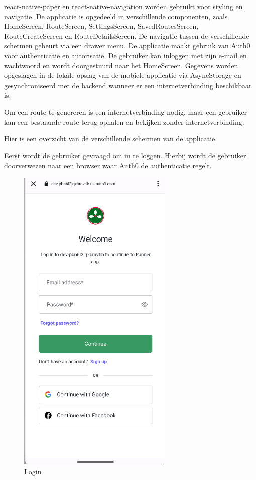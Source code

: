    react-native-paper en react-native-navigation worden gebruikt voor styling en navigatie. 
    De applicatie is opgedeeld in verschillende componenten, 
    zoals HomeScreen, RouteScreen, SettingsScreen, SavedRoutesScreen, RouteCreateScreen en RouteDetailsScreen. 
    De navigatie tussen de verschillende schermen gebeurt via een drawer menu. 
    De applicatie maakt gebruik van Auth0 voor authenticatie en autorisatie. 
    De gebruiker kan inloggen met zijn e-mail en wachtwoord en wordt doorgestuurd naar het HomeScreen. 
    Gegevens worden opgeslagen in de lokale opslag van de mobiele applicatie via AsyncStorage 
    en gesynchroniseerd met de backend wanneer er een internetverbinding beschikbaar is.

    Om een route te genereren is een internetverbinding nodig, 
    maar een gebruiker kan een bestaande route terug ophalen en bekijken zonder internetverbinding.
    
    Hier is een overzicht van de verschillende schermen van de applicatie.
    
    Eerst wordt de gebruiker gevraagd om in te loggen. Hierbij wordt de gebruiker doorverwezen naar een browser waar Auth0 de authenticatie regelt.

    \begin{figure}[htbp]
        \includegraphics[width=20em]{./graphics/login.png}
        \centering
        \caption{Login}
        \label{fig:login}
    \end{figure}

